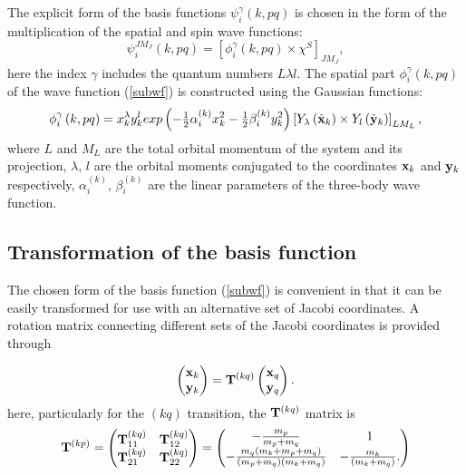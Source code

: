 \documentclass[
12pt, %
oneside, %
english, %
onehalfspacing, %
headsepline, %
]{MastersDoctoralThesis} %
\begin{document}
The explicit form of the basis functions $ \psi_{i}^{\gamma} \left(k, pq \right) $ is chosen in the form of the multiplication of the spatial and spin wave functions:
\begin{equation}
\psi_{i}^{JM_J}\left(k, pq \right) = \left[ \phi_{i}^{\gamma} \left(k, pq \right) 
\times \chi^{S} \right] _{JM_{J}},
\label{subwf}
\end{equation}
here the index $\gamma$ includes the quantum numbers $L \lambda l$. The spatial part $\phi_{i}^{\gamma} \left(k, pq \right) $ of the wave function (\ref {subwf}) is constructed using the Gaussian functions:
 \begin{equation}
 \phi_{i}^{\gamma} \left(k, pq \right) =
 x_{k}^{\lambda} y_{k}^{l} exp\left(- \tfrac{1}{2}\alpha^{(k)}_{i} x_{k}^{2} - \tfrac{1}{2} \beta^{(k)}_{i}  y_{k}^{2} \right) 
 \left[ Y_\lambda \left(  \hat{ \bf x}_k \right) \times Y_l \left( \hat{\bf y}_k \right) \right]_{LM_L},
 \label{radial_wf}
 \end{equation}
where $ L $ and $ M_L $ are the total orbital momentum of the system and its projection, $ \lambda $, $ l $ are the orbital moments conjugated to the coordinates $ {\bf x} _k $ and $ {\bf y} _k $ respectively, $ \alpha^{(k)} _ {i} $, $ \beta^{(k)}_{i}$ are the linear parameters of the three-body wave function.
 \subsection{Transformation of the basis function }
 The chosen form of the basis function (\ref{subwf}) is convenient in that it can be easily transformed for use with an alternative set of Jacobi coordinates. A rotation matrix connecting different sets of the Jacobi coordinates is provided through
 
\begin{equation}
\begin{pmatrix}
{\bf x}_k \\ 
{\bf y}_k
\end{pmatrix}  = {\bf T}^{(kq)}
\begin{pmatrix}
{\bf x}_q \\ 
{\bf y}_q
\end{pmatrix}.
\end{equation}
here, particularly for  the $(kq)$ transition, the ${\bf T}^{(kq)}$ matrix is 
\begin{equation}
{\bf T}^{(kp)} = 
 \begin{pmatrix}
 {\bf T}^{(kq)}_{11} & {\bf T}^{(kq)}_{12} \\
 {\bf T}^{(kq)}_{21}  &  {\bf T}^{(kq)}_{22}
 \end{pmatrix}
=
 \begin{pmatrix}
 -\tfrac{m_p}{m_p+m_q} & 1 \\
 -\tfrac{m_q(m_k+m_p+m_q)}{(m_p+m_q)(m_k+m_q)}  &  -\tfrac{m_k}{(m_k+m_q)}.
 \end{pmatrix}
\end{equation}
\end{document}
